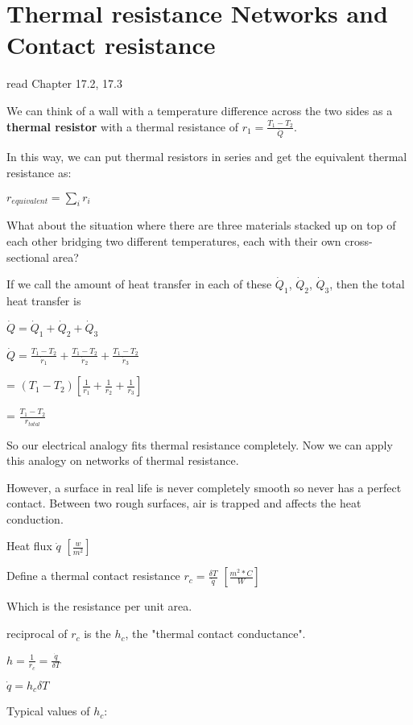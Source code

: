 \documentclass{article}
\begin{document}
\section{Thermal resistance Networks and Contact resistance}
read Chapter 17.2, 17.3

We can think of a wall with a temperature difference across the two sides as a \textbf{thermal resistor} with a thermal resistance of $r_1 = \frac{T_1 - T_2}{\dot{Q}}$.

In this way, we can put thermal resistors in series and get the equivalent thermal resistance as:

$r_{equivalent} = \sum_{i} {r_i}$

What about the situation where there are three materials stacked up on top of each other bridging two different temperatures, each with their own cross-sectional area?

If we call the amount of heat transfer in each of these $\dot{Q}_1$, $\dot{Q}_2$, $\dot{Q}_3$, then the total heat transfer is

$\dot{Q} = \dot{Q}_1 + \dot{Q}_2 + \dot{Q}_3$

$\dot{Q} = \frac{T_1 - T_2}{\dot{r}_1} + \frac{T_1 - T_2}{\dot{r}_2} + \frac{T_1 - T_2}{\dot{r}_3}$

= $(T_1 - T_2)[\frac{1}{r_1} + \frac{1}{r_2} + \frac{1}{r_3}]$

= $\frac{T_1 - T_2}{r_{total}}$

So our electrical analogy fits thermal resistance completely. Now we can apply this analogy on networks of thermal resistance.


However, a surface in real life is never completely smooth so never has a perfect contact. Between two rough surfaces, air is trapped and affects the heat conduction.

Heat flux $\dot{q}$ $[\frac{w}{m^2}]$

Define a thermal contact resistance
$r_c = \frac{\delta T}{\dot{q}}$ $[\frac{m^2 * C}{W}]$

Which is the resistance per unit area.

reciprocal of $r_c$ is the $h_c$, the "thermal contact conductance".

$h = \frac{1}{r_c} = \frac{\dot{q}}{\delta T}$

$\dot{q} = h_c \delta T$

Typical values of $h_c$:
\end{document}
